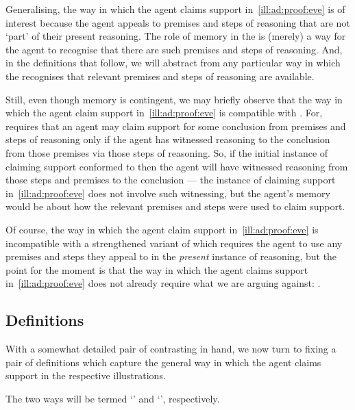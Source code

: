 \begin{note}
  Generalising, the way in which the agent claims support in~\autoref{ill:ad:proof:eve} is of interest because the agent appeals to premises and steps of reasoning that are not `part' of their present reasoning.
  The role of memory in the  is (merely) a way for the agent to recognise that there are such premises and steps of reasoning.
  And, in the definitions that follow, we will abstract from any particular way in which the recognises that relevant premises and steps of reasoning are available.

  Still, even though memory is contingent, we may briefly observe that the way in which the agent claim support in~\autoref{ill:ad:proof:eve} is compatible with \ESU{}.
  For, \ESU{} requires that an agent may claim support for some conclusion from premises and steps of reasoning only if the agent has witnessed reasoning to the conclusion from those premises via those steps of reasoning.
  So, if the initial instance of claiming support conformed to \ESU{} then the agent will have witnessed reasoning from those steps and premises to the conclusion --- the instance of claiming support in~\autoref{ill:ad:proof:eve} does not involve such witnessing, but the agent's memory would be about how the relevant premises and steps were used to claim support.

  Of course, the way in which the agent claim support in~\autoref{ill:ad:proof:eve} is incompatible with a strengthened variant of \ESU{} which requires the agent to use any premises and steps they appeal to in the \emph{present} instance of reasoning, but the point for the moment is that the way in which the agent claims support in~\autoref{ill:ad:proof:eve} does not already require what we are arguing against: \ESU{}.
\end{note}

\subsection{Definitions}

\begin{note}
  With a somewhat detailed pair of contrasting  in hand, we now turn to fixing a pair of definitions which capture the general way in which the agent claims support in the respective illustrations.

  The two ways will be termed `\adA{}' and `\adB{}', respectively.
\end{note}

